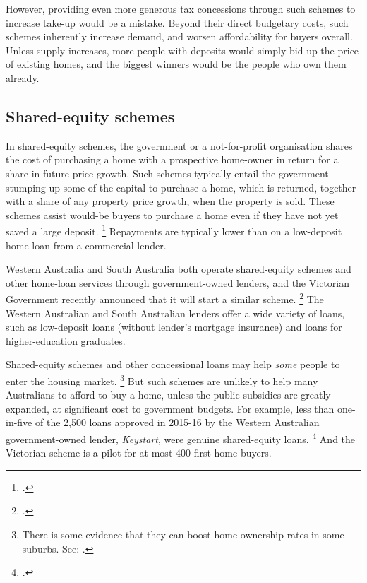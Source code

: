 However, providing even more generous tax concessions through such schemes to increase take-up would be a mistake.
Beyond their direct budgetary costs, such schemes inherently increase demand, and worsen affordability for buyers overall.
Unless supply increases, more people with deposits would simply bid-up the price of existing homes, and the biggest winners would be the people who own them already.

\subsection{Shared-equity schemes }\label{subsec:shared-equity-schemes}

In shared-equity schemes, the government or a not-for-profit organisation shares the cost of purchasing a home with a prospective home-owner in return for a share in future price growth.
Such schemes typically entail the government stumping up some of the capital to purchase a home, which is returned, together with a share of any property price growth, when the property is sold.
These schemes assist would-be buyers to purchase a home even if they have not yet saved a large deposit.%
	\footcite{Mihaylov-Zurbruegg-2014-Socioeconic-impact-shared-appreciationj-SA}
Repayments are typically lower than on a low-deposit home loan from a commercial lender.

Western Australia and South Australia both operate shared-equity schemes and other home-loan services through government-owned lenders, and the Victorian Government recently announced that it will start a similar scheme.%
	\footcite[][13]{VicStateGov2017Homes}
The Western Australian and South Australian lenders offer a wide variety of loans, such as low-deposit loans (without lender's mortgage insurance) and loans for higher-education graduates.

Shared-equity schemes and other concessional loans may help \emph{some} people to enter the housing market.%
	\footnote{There is some evidence that they can boost home-ownership rates in some suburbs.
	See: \textcite{Li_Mihaylov_Zurbruegg_2016_SA_HomeStart}.}
But such schemes are unlikely to help many Australians to afford to buy a home, unless the public subsidies are greatly expanded, at significant cost to government budgets.
For example, less than one-in-five of the 2,500 loans approved in 2015-16 by the Western Australian government-owned lender, \textit{Keystart}, were genuine shared-equity loans.%
\footcite{Housing-authority-2016-Annual-report}
 And the Victorian scheme is a pilot for at most 400 first home buyers.

